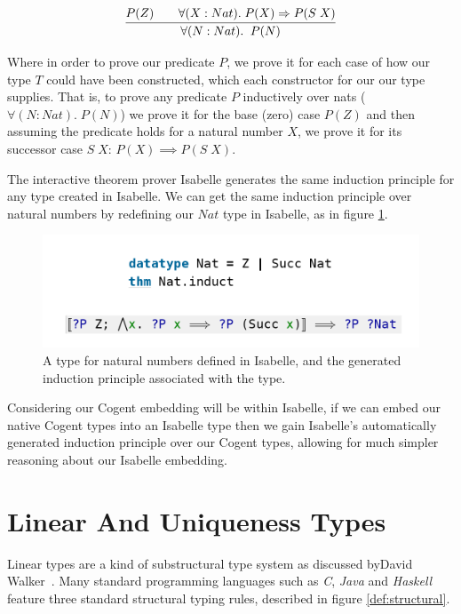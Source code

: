 \[
    \infer{
        \forall(N : Nat).\;\; P(N)
    }{
        P(Z) \quad & \forall (X : Nat).\; P(X) \implies P(S\; X)
    }
\]

Where in order to prove our predicate $P$, we prove it for each case of how our type $T$ could have been
constructed, which each constructor for our our type supplies.
That is, to prove any predicate $P$ inductively over nats ($\forall(N : Nat).\; P(N)$)
we prove it for the base (zero) case $P(Z)$ and then assuming the predicate holds
for a natural number $X$, we prove it for its successor case $S\; X$: $P(X) \implies P(S\; X)$.

The interactive theorem prover Isabelle generates the same induction principle for any type created in
Isabelle. We can get the same induction principle over natural numbers by redefining our $Nat$
type in Isabelle, as in figure \ref{fig:IsabelleNatInduct}.

\begin{center}
    \begin{figure}
        \includegraphics[width=\linewidth]{content/isabelleNatInduct.png}
        \caption{A type for natural numbers defined in Isabelle, and the generated 
        induction principle associated with the type.}
        \label{fig:IsabelleNatInduct}
    \end{figure}
\end{center}

\FloatBarrier

Considering our Cogent embedding will be within Isabelle, if we can embed our native
Cogent types into an Isabelle type then we gain Isabelle's automatically generated
induction principle over our Cogent types, allowing for much 
simpler reasoning about our Isabelle embedding.

\section{Linear And Uniqueness Types}

Linear types are a kind of substructural type system as discussed by\newline David Walker~\citep{Substructural}.
Many standard programming languages such as \textit{C}, \textit{Java} and \textit{Haskell} feature
three standard structural typing rules, described in figure \ref{def:structural}.

